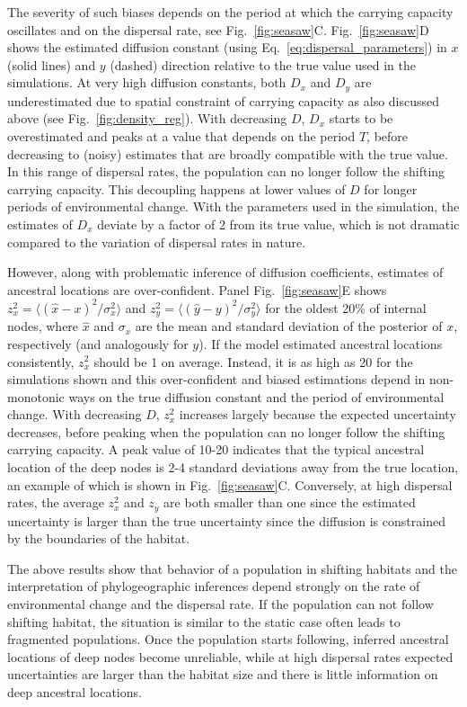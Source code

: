 \documentclass[aps,rmp, twocolumn]{revtex4}
\begin{document}
The severity of such biases depends on the period at which the carrying capacity oscillates and on the dispersal rate, see  Fig.~\ref{fig:seasaw}C.
Fig.~\ref{fig:seasaw}D shows the estimated diffusion constant (using Eq.~\ref{eq:dispersal_parameters}) in $x$ (solid lines) and $y$ (dashed) direction relative to the true value used in the simulations.
At very high diffusion constants, both $D_x$ and $D_y$ are underestimated due to spatial constraint of carrying capacity as also discussed above (see Fig.~\ref{fig:density_reg}).
With decreasing $D$, $D_x$ starts to be overestimated and peaks at a value that depends on the period $T$, before decreasing to (noisy) estimates that are broadly compatible with the true value.
In this range of dispersal rates, the population can no longer follow the shifting carrying capacity.
This decoupling happens at lower values of $D$ for longer periods of environmental change.
With the parameters used in the simulation, the estimates of $D_x$ deviate by a factor of 2 from its true value, which is not dramatic compared to the variation of dispersal rates in nature.

However, along with problematic inference of diffusion coefficients, estimates of ancestral locations are over-confident.
Panel Fig.~\ref{fig:seasaw}E shows $z_x^2 = \langle (\hat{x} - x)^2/\sigma_x^2 \rangle$ and $z_y^2=\langle (\hat{y} - y)^2/\sigma_y^2\rangle$ for the oldest 20\% of internal nodes, where $\hat{x}$ and $\sigma_x$ are the mean and standard deviation of the posterior of $x$, respectively (and analogously for $y$).
If the model estimated ancestral locations consistently, $z_x^2$ should be 1 on average.
Instead, it is as high as 20 for the simulations shown and this over-confident and biased estimations depend in non-monotonic ways on the true diffusion constant and the period of environmental change.
With decreasing $D$, $z_x^2$ increases largely because the expected uncertainty decreases, before peaking when the population can no longer follow the shifting carrying capacity.
A peak value of 10-20 indicates that the typical ancestral location of the deep nodes is 2-4 standard deviations away from the true location, an example of which is shown in Fig.~\ref{fig:seasaw}C.
Conversely, at high dispersal rates, the average $z_x^2$ and $z_y$ are both smaller than one since the estimated uncertainty is larger than the true uncertainty since the diffusion is constrained by the boundaries of the habitat.


The above results show that behavior of a population in shifting habitats and the interpretation of phylogeographic inferences depend strongly on the rate of environmental change and the dispersal rate.
If the population can not follow shifting habitat, the situation is similar to the static case often leads to fragmented populations.
Once the population starts following, inferred ancestral locations of deep nodes become unreliable, while at high dispersal rates expected uncertainties are larger than the habitat size and there is little information on deep ancestral locations.
\end{document}
